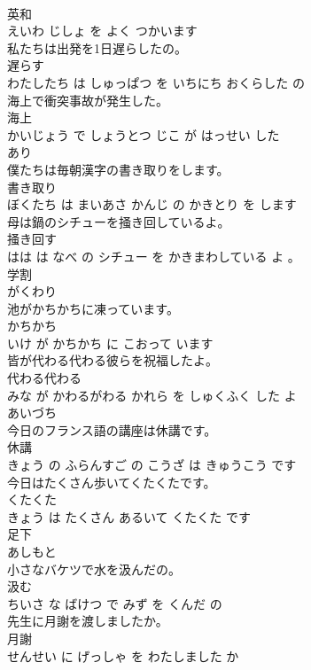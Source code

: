 \documentclass[8pt]{extreport}
\begin{document}
\begin{CJK}{UTF8}{min}
\\	英和 
\\	えいわ じしょ を よく つかいます			
\\	私たちは出発を1日遅らしたの。	
\\	遅らす 
\\	わたしたち は しゅっぱつ を いちにち おくらした の			
\\	海上で衝突事故が発生した。	
\\	海上 
\\	かいじょう で しょうとつ じこ が はっせい した			
\\	あり	
\\	僕たちは毎朝漢字の書き取りをします。	
\\	書き取り 
\\	ぼくたち は まいあさ かんじ の かきとり を します			
\\	母は鍋のシチューを掻き回しているよ。	
\\	掻き回す 
\\	はは は なべ の シチュー を かきまわしている よ 。			
\\	学割	
\\	がくわり		
\\	池がかちかちに凍っています。	
\\	かちかち 
\\	いけ が かちかち に こおって います			
\\	皆が代わる代わる彼らを祝福したよ。	
\\	代わる代わる 
\\	みな が かわるがわる かれら を しゅくふく した よ			
\\	あいづち	
\\	今日のフランス語の講座は休講です。	
\\	休講 
\\	きょう の ふらんすご の こうざ は きゅうこう です			
\\	今日はたくさん歩いてくたくたです。	
\\	くたくた 
\\	きょう は たくさん あるいて くたくた です			
\\	足下	
\\	あしもと		
\\	小さなバケツで水を汲んだの。	
\\	汲む 
\\	ちいさ な ばけつ で みず を くんだ の			
\\	先生に月謝を渡しましたか。	
\\	月謝 
\\	せんせい に げっしゃ を わたしました か			

\end{CJK}
\end{document}
